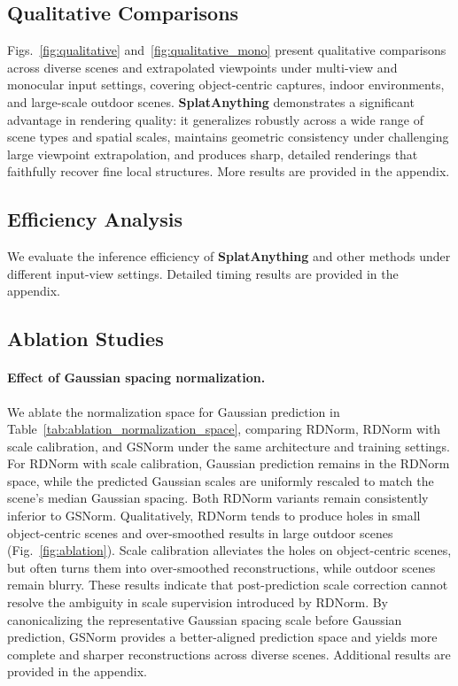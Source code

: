 \subsection{Qualitative Comparisons}

Figs.~\ref{fig:qualitative} and~\ref{fig:qualitative_mono} present qualitative comparisons across diverse scenes and extrapolated viewpoints under multi-view and monocular input settings, covering object-centric captures, indoor environments, and large-scale outdoor scenes. \textbf{SplatAnything} demonstrates a significant advantage in rendering quality: it generalizes robustly across a wide range of scene types and spatial scales, maintains geometric consistency under challenging large viewpoint
extrapolation, and produces sharp, detailed renderings that faithfully recover fine local structures. More results are provided in the appendix.
\subsection{Efficiency Analysis}
We evaluate the inference efficiency of \textbf{SplatAnything} and other methods under different input-view settings. Detailed timing results are provided in the appendix.

\subsection{Ablation Studies}
\paragraph{Effect of Gaussian spacing normalization.}
We ablate the normalization space for Gaussian prediction in
Table~\ref{tab:ablation_normalization_space}, comparing RDNorm,
RDNorm with scale calibration, and GSNorm under the same architecture
and training settings.
For RDNorm with scale calibration, Gaussian prediction remains in the
RDNorm space, while the predicted Gaussian scales are uniformly rescaled
to match the scene's median Gaussian spacing. Both RDNorm variants remain consistently inferior to GSNorm.
Qualitatively, RDNorm tends to produce holes in small object-centric
scenes and over-smoothed results in large outdoor scenes
(Fig.~\ref{fig:ablation}).
Scale calibration alleviates the holes on object-centric scenes, but
often turns them into over-smoothed reconstructions, while outdoor scenes
remain blurry.
These results indicate that post-prediction scale correction cannot
resolve the ambiguity in scale supervision introduced by RDNorm.
By canonicalizing the representative Gaussian spacing scale before Gaussian
prediction, GSNorm provides a better-aligned prediction space and yields
more complete and sharper reconstructions across diverse scenes. 
Additional results are provided in the appendix.

